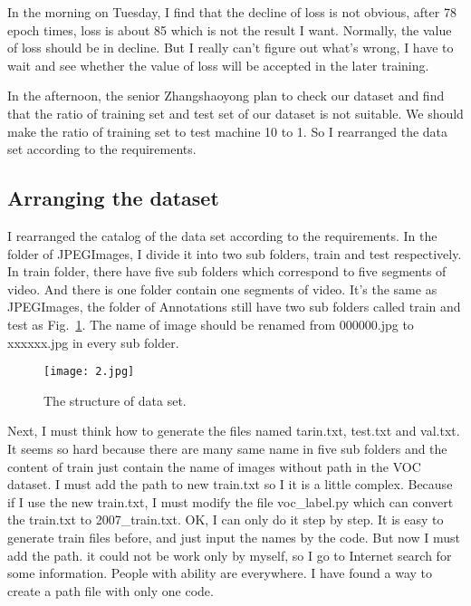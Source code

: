 \documentclass[a4paper]{article}
\begin{document}
\par 
In the morning on Tuesday, I find that the decline of loss is not obvious, after 78 epoch times, loss is about 85 which is not the result I want. Normally, the value of loss should be in decline. But I really can't figure out what's wrong, I have to wait and see whether the value of loss will be accepted in the later training.
\par 
In the afternoon, the senior Zhangshaoyong plan to check our dataset and find that the ratio of training set and test set of our dataset is not suitable. We should make the ratio of training set to test machine 10 to 1. So I rearranged the data set according to the requirements.
\par
\subsection{Arranging the dataset}
I rearranged the catalog of the data set according to the requirements. In the folder of JPEGImages, I divide it into two sub folders, train and test respectively. In train folder, there have five sub folders which correspond to five segments of video. And there is one folder contain one segments of video. It's the same as JPEGImages, the folder of Annotations still have two sub folders called train and test as Fig.~\ref{2}. The name of image should be renamed from 000000.jpg to xxxxxx.jpg in every sub folder.
\begin{figure}[h]
	\begin{center}
		\texttt{[image: 2.jpg]}\\
		\caption{The structure of data set.}\label{2}
	\end{center}
\end{figure}
\par 
Next, I must think how to generate the files named tarin.txt, test.txt and val.txt. It seems so hard because there are many same name in five sub folders and the content of train just contain the name of images without path in the VOC dataset. I must add the path to new train.txt so I it is a little complex. Because if I use the new train.txt, I must modify the file voc\_label.py which can convert the train.txt to 2007\_train.txt. 
OK, I can only do it step by step. It is easy to generate train files before, and just input the names by the code. But now I must add the path. it could not be work only by myself, so I go to Internet search for some information. People with ability are everywhere. I have found a way to create a path file with only one code.
\end{document}
